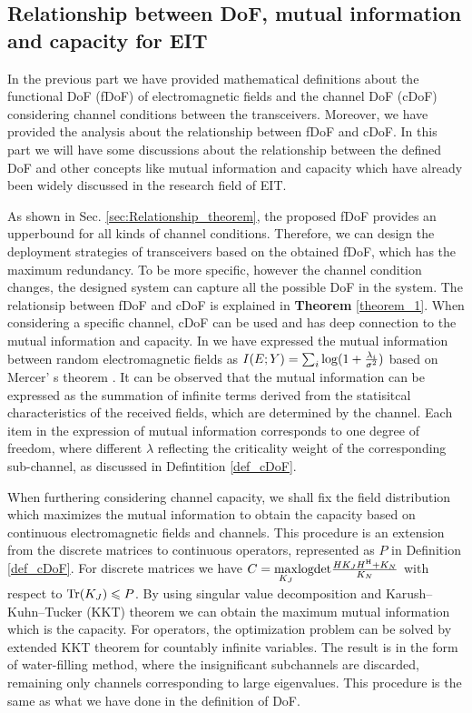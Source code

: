 \documentclass[12pt,draftclsnofoot,journal,onecolumn]{IEEEtran}
\begin{document}
	{\color{red}\subsection{Relationship between DoF, mutual information and capacity for EIT}
	
	In the previous part we have provided mathematical definitions about the functional DoF (fDoF) of electromagnetic fields and the channel DoF (cDoF) considering channel conditions between the transceivers. Moreover, we have provided the analysis about the relationship between fDoF and cDoF. In this part we will have some discussions about the relationship between the defined DoF and other concepts like mutual information and capacity which have already been widely discussed in the research field of EIT.

	As shown in Sec. \ref{sec:Relationship_theorem}, the proposed fDoF provides an upperbound for all kinds of channel conditions. Therefore, we can design the deployment strategies of transceivers based on the obtained fDoF, which has the maximum redundancy. To be more specific, however the channel condition changes, the designed system can capture all the possible DoF in the system. The relationsip between fDoF and cDoF is explained in {\bf Theorem} \ref{theorem_1}. When considering a specific channel, cDoF can be used and has deep connection to the mutual information and capacity. In \cite{wan2022mutual} we have expressed the mutual information between random electromagnetic fields as $I(E;Y) = \sum_i{\rm log}(1+\frac{\lambda_i}{\sigma^2})$ based on Mercer' s theorem \cite{mercer1909xvi}. It can be observed that the mutual information can be expressed as the summation of infinite terms derived from the statisitcal characteristics of the received fields, which are determined by the channel. Each item in the expression of mutual information corresponds to one degree of freedom, where different $\lambda$ reflecting the criticality weight of the corresponding sub-channel, as discussed in Defintition \ref{def_cDoF}.

	When furthering considering channel capacity, we shall fix the field distribution which maximizes the mutual information to obtain the capacity based on continuous electromagnetic fields and channels. This procedure is an extension from the discrete matrices to continuous operators, represented as $P$ in Definition \ref{def_cDoF}. For discrete matrices we have $C = \underset{K_J}{\rm max}{\rm logdet}\frac{HK_JH^{\rm H}+K_N}{K_N}$ with respect to ${\rm Tr}(K_J) \leqslant P$. By using singular value decomposition and Karush–Kuhn–Tucker (KKT) theorem we can obtain the maximum mutual information which is the capacity. For operators, the optimization problem can be solved by extended KKT theorem \cite{bachir2021finitely} for countably infinite variables. The result is in the form of water-filling method, where the insignificant subchannels are discarded, remaining only channels corresponding to large eigenvalues. This procedure is the same as what we have done in the definition of DoF. 

}
\end{document}
